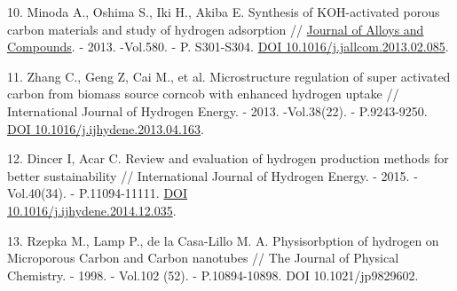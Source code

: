 \begin{references}
10. Minoda A., Oshima S., Iki H., Akiba E. Synthesis of KOH-activated
porous carbon materials and study of hydrogen adsorption //
\href{https://www.researchgate.net/journal/Journal-of-Alloys-and-Compounds-0925-8388?_tp=eyJjb250ZXh0Ijp7ImZpcnN0UGFnZSI6InB1YmxpY2F0aW9uIiwicGFnZSI6InB1YmxpY2F0aW9uIn19}{Journal
of Alloys and Compounds}. - 2013. -Vol.580. - P. S301-S304.
\href{https://doi.org/10.1016/j.jallcom.2013.02.085}{DOI
10.1016/j.jallcom.2013.02.085}.

11. Zhang C., Geng Z, Cai M., et al. Microstructure regulation of super
activated carbon from biomass source corncob with enhanced hydrogen
uptake // International Journal of Hydrogen Energy. - 2013. -Vol.38(22).
- P.9243-9250.
\href{https://doi.org/10.1016/j.ijhydene.2013.04.163}{DOI
10.1016/j.ijhydene.2013.04.163}.

12. Dincer I, Acar C. Review and evaluation of hydrogen production
methods for better sustainability // International Journal of Hydrogen
Energy. - 2015. -Vol.40(34). - P.11094-11111.
\href{https://doi.org/10.1016/j.ijhydene.2014.12.035}{DOI\\
10.1016/j.ijhydene.2014.12.035}.

13. Rzepka M., Lamp P., de la Casa-Lillo M. A. Physisorbption of hydrogen
on Microporous Carbon and Carbon nanotubes // The Journal of Physical
Chemistry. - 1998. - Vol.102 (52). - P.10894-10898. DOI
10.1021/jp9829602.
\end{references}

